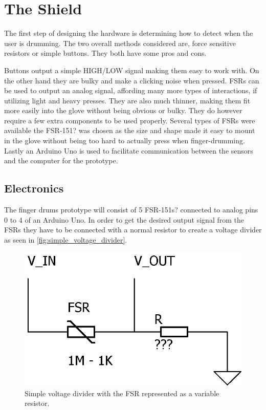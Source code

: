 \chapter{The Shield}
\label{the_shield}
The first step of designing the hardware is determining how to detect when the user is drumming. The two overall methods considered are, force sensitive resistors or simple buttons. They both have some pros and cons. 

Buttons output a simple HIGH/LOW signal making them easy to work with. On the other hand they are bulky and make a clicking noise when pressed.
FSRs can be used to output an analog signal, affording many more types of interactions, if utilizing light and heavy presses. They are also much thinner, making them fit more easily into the glove without being obvious or bulky. They do however require a few extra components to be used properly. Several types of FSRs were available the FSR-151? was chosen as the size and shape made it easy to mount in the glove without being too hard to actually press when finger-drumming.
\blankline 
Lastly an Arduino Uno is used to facilitate communication between the sensors and the computer for the prototype. 

\section{Electronics}
\label{electronics}
The finger drums prototype will consist of 5 FSR-151s? connected to analog pins 0 to 4 of an Arduino Uno. In order to get the desired output signal from the FSRs they have to be connected with a normal resistor to create a voltage divider as seen in \autoref{fig:simple_voltage_divider}. 

\begin{figure}[H]
\centering
\includegraphics[scale=1.5]{Figure/simple_voltage_divider.png}
\caption{Simple voltage divider with the FSR represented as a variable resistor. }
\label{fig:simple_voltage_divider}
\end{figure}

